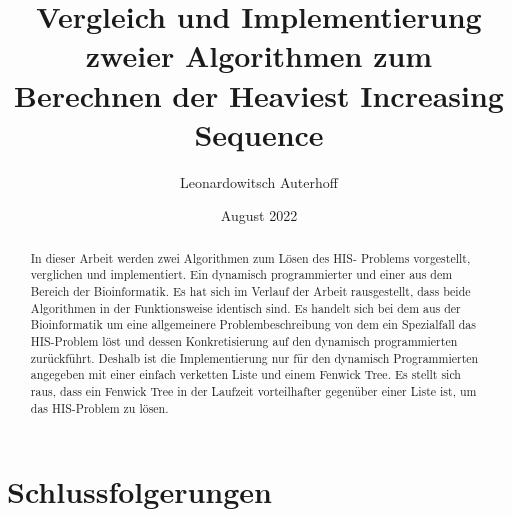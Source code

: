 \documentclass{article}
\title{Vergleich und Implementierung zweier Algorithmen zum Berechnen der Heaviest Increasing Sequence}
\author{Leonardowitsch Auterhoff }
\date{August 2022}
\begin{document}
\newcommand{\an}{$a_1a_2a_3$\dots$a_n$}
\maketitle

\tableofcontents

\newpage

\begin{abstract}
    In dieser Arbeit werden zwei Algorithmen zum Lösen des HIS-
    Problems vorgestellt, verglichen und implementiert. Ein dynamisch programmierter und einer aus dem Bereich der Bioinformatik. Es hat sich im Verlauf der Arbeit rausgestellt, dass beide Algorithmen in der Funktionsweise identisch sind. Es handelt sich bei dem aus der Bioinformatik um eine allgemeinere Problembeschreibung von dem ein Spezialfall das HIS-Problem löst und dessen Konkretisierung auf den dynamisch programmierten zurückführt. Deshalb ist die Implementierung nur für den dynamisch Programmierten angegeben mit einer einfach verketten Liste und einem Fenwick Tree. Es stellt sich raus, dass ein Fenwick Tree in der Laufzeit vorteilhafter gegenüber einer Liste ist, um das HIS-Problem zu lösen.
\end{abstract}
















\section{Schlussfolgerungen}



\newpage


\end{document}
